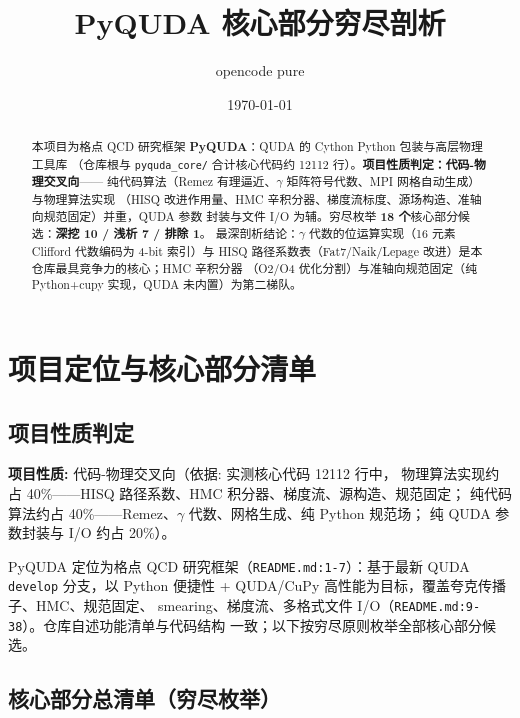 \documentclass[UTF8]{ctexart}
\title{PyQUDA 核心部分穷尽剖析}
\author{opencode pure}
\date{\today}
\begin{document}
\maketitle

\begin{abstract}
本项目为格点 QCD 研究框架 \textbf{PyQUDA}：QUDA 的 Cython Python 包装与高层物理工具库
（仓库根与 \texttt{pyquda\_core/} 合计核心代码约 12112 行）。\textbf{项目性质判定：代码-物理交叉向}——
纯代码算法（Remez 有理逼近、$\gamma$ 矩阵符号代数、MPI 网格自动生成）与物理算法实现
（HISQ 改进作用量、HMC 辛积分器、梯度流标度、源场构造、准轴向规范固定）并重，QUDA 参数
封装与文件 I/O 为辅。穷尽枚举 \textbf{18 个}核心部分候选：\textbf{深挖 10 / 浅析 7 / 排除 1}。
最深剖析结论：$\gamma$ 代数的位运算实现（16 元素 Clifford 代数编码为 4-bit 索引）与
HISQ 路径系数表（Fat7/Naik/Lepage 改进）是本仓库最具竞争力的核心；HMC 辛积分器
（O2/O4 优化分割）与准轴向规范固定（纯 Python+cupy 实现，QUDA 未内置）为第二梯队。
\end{abstract}

\tableofcontents

\section{项目定位与核心部分清单}

\subsection{项目性质判定}

\begin{keybox}
\textbf{项目性质:} \textcolor{phys}{代码-物理交叉向}（依据: 实测核心代码 12112 行中，
物理算法实现约占 40\%——HISQ 路径系数、HMC 积分器、梯度流、源构造、规范固定；
纯代码算法约占 40\%——Remez、$\gamma$ 代数、网格生成、纯 Python 规范场；
纯 QUDA 参数封装与 I/O 约占 20\%）。
\end{keybox}

PyQUDA 定位为格点 QCD 研究框架（\texttt{README.md:1-7}）：基于最新 QUDA \texttt{develop}
分支，以 Python 便捷性 + QUDA/CuPy 高性能为目标，覆盖夸克传播子、HMC、规范固定、
smearing、梯度流、多格式文件 I/O（\texttt{README.md:9-38}）。仓库自述功能清单与代码结构
一致；以下按穷尽原则枚举全部核心部分候选。

\subsection{核心部分总清单（穷尽枚举）}
\end{document}
